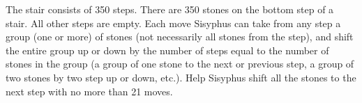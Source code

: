 \problem
The stair consists of 350 steps.
There are 350 stones on the bottom step of a stair.
All other steps are empty.
Each move Sisyphus can take from any step a group (one or more) of stones
(not necessarily all stones from the step), and shift the entire group up or
down by the number of steps equal to the number of stones in the group
(a group of one stone to the next or previous step, a group of two stones by
two step up or down, etc.).
Help Sisyphus shift all the stones to the next step with no more than
21 moves.
\solution
\endproblem
